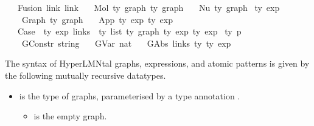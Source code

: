 \begin{isabellebody}
\ \ {\isacharbar}{\kern0pt}\ Fusion\ link\ link\isanewline
\ \ {\isacharbar}{\kern0pt}\ Mol\ {\isachardoublequoteopen}{\isacharprime}{\kern0pt}ty\ graph{\isachardoublequoteclose}\ {\isachardoublequoteopen}{\isacharprime}{\kern0pt}ty\ graph{\isachardoublequoteclose}\isanewline
\ \ {\isacharbar}{\kern0pt}\ Nu\ {\isachardoublequoteopen}{\isacharprime}{\kern0pt}ty\ graph{\isachardoublequoteclose}\isanewline
{}\ {\isacharprime}{\kern0pt}ty\ exp\ {\isacharequal}{\kern0pt}\isanewline
\ \ \ \ Graph\ {\isachardoublequoteopen}{\isacharprime}{\kern0pt}ty\ graph{\isachardoublequoteclose}\isanewline
\ \ {\isacharbar}{\kern0pt}\ App\ {\isachardoublequoteopen}{\isacharprime}{\kern0pt}ty\ exp{\isachardoublequoteclose}\ {\isachardoublequoteopen}{\isacharprime}{\kern0pt}ty\ exp{\isachardoublequoteclose}\ {\isacharparenleft}{\kern0pt}\ {\isacartoucheopen}{\isasymcdot}{\isacartoucheclose}\ {}{}{}{\isacharparenright}{\kern0pt}\isanewline
\ \ {\isacharbar}{\kern0pt}\ Case\ \ {\isachardoublequoteopen}{\isacharprime}{\kern0pt}ty\ exp{\isachardoublequoteclose}\ {\isachardoublequoteopen}{\isacharparenleft}{\kern0pt}links\ {\isacharasterisk}{\kern0pt}\ {\isacharprime}{\kern0pt}ty{\isacharparenright}{\kern0pt}\ list{\isachardoublequoteclose}\ {\isachardoublequoteopen}{\isacharprime}{\kern0pt}ty\ graph{\isachardoublequoteclose}\ {\isachardoublequoteopen}{\isacharprime}{\kern0pt}ty\ exp{\isachardoublequoteclose}\ {\isachardoublequoteopen}{\isacharprime}{\kern0pt}ty\ exp{\isachardoublequoteclose}\isanewline
{}\ {\isacharprime}{\kern0pt}ty\ p\ {\isacharequal}{\kern0pt}\isanewline
\ \ \ \ GConstr\ string\isanewline
\ \ {\isacharbar}{\kern0pt}\ GVar\ nat\isanewline
\ \ {\isacharbar}{\kern0pt}\ GAbs\ links\ {\isacharprime}{\kern0pt}ty\ {\isachardoublequoteopen}{\isacharprime}{\kern0pt}ty\ exp{\isachardoublequoteclose}%
\begin{isamarkuptext}%
The syntax of HyperLMNtal graphs, expressions, and atomic patterns is
given by the following mutually recursive datatypes.

%
\begin{itemize}%
\item {} is the type of graphs, parameterised by a type annotation
.

%
\begin{itemize}%
\item {} is the empty graph.


\end{itemize}
\end{itemize}
\end{isamarkuptext}
\end{isabellebody}
